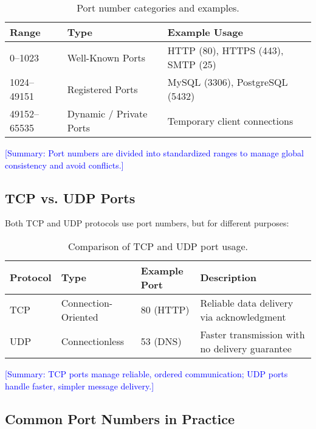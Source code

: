 \documentclass[12pt]{article}
\begin{document}
\begin{table}[h!]
    \centering
    \begin{tabular}{@{}lll@{}}
        \toprule
        \textbf{Range} & \textbf{Type}           & \textbf{Example Usage}            \\ \midrule
        0–1023         & Well-Known Ports        & HTTP (80), HTTPS (443), SMTP (25) \\
        1024–49151     & Registered Ports        & MySQL (3306), PostgreSQL (5432)   \\
        49152–65535    & Dynamic / Private Ports & Temporary client connections      \\ \bottomrule
    \end{tabular}
    \caption{Port number categories and examples.}
\end{table}

\textcolor{blue}{[Summary: Port numbers are divided into standardized ranges to manage global consistency and avoid conflicts.]}

\subsection{TCP vs. UDP Ports}
Both TCP and UDP protocols use port numbers, but for different purposes:

\begin{table}[h!]
    \centering
    \begin{tabular}{@{}llll@{}}
        \toprule
        \textbf{Protocol} & \textbf{Type}       & \textbf{Example Port} & \textbf{Description}                           \\ \midrule
        TCP               & Connection-Oriented & 80 (HTTP)             & Reliable data delivery via acknowledgment      \\
        UDP               & Connectionless      & 53 (DNS)              & Faster transmission with no delivery guarantee \\ \bottomrule
    \end{tabular}
    \caption{Comparison of TCP and UDP port usage.}
\end{table}

\textcolor{blue}{[Summary: TCP ports manage reliable, ordered communication; UDP ports handle faster, simpler message delivery.]}

\subsection{Common Port Numbers in Practice}
\end{document}
